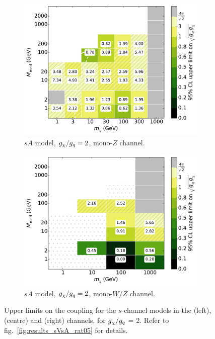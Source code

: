 \begin{figure}
\begin{subfigure}[t]{0.32\textwidth}
    \includegraphics[width=1.\textwidth]{figures/grid_allpoints_SAD_rat2.pdf}
    \caption{$sA$ model, $g_{\chi}/g_q = 2$, mono-$Z$ channel.}
  \end{subfigure}
  \begin{subfigure}[t]{0.32\textwidth}
    \centering
    \includegraphics[width=1.\textwidth]{figures/grid_basepoints_SAD_rat2_monoWZ.pdf}
    \caption{$sA$ model, $g_{\chi}/g_q = 2$, mono-$W/Z$ channel.}
  \end{subfigure}
  \caption{Upper limits on the coupling for the $s$-channel models in the \monojet (left), \monoZ (centre) and \monoWZ (right) channels, for $g_{\chi} / g_q$ = 2. Refer to fig.~\ref{fig:results_sVsA_rat05} for details.}
  \label{fig:results_sVsA_rat2}
\end{figure}

